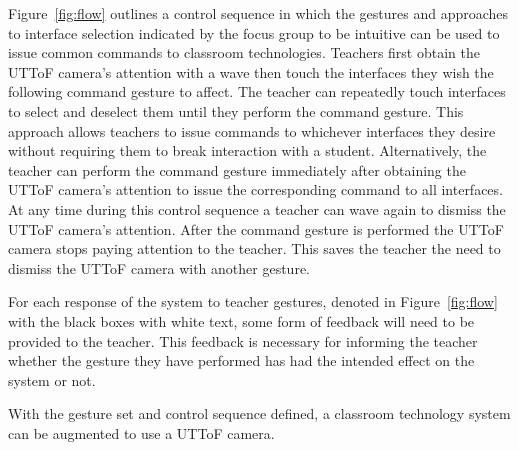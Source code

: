 \documentclass[manuscript, review, screen]{acmart}
\begin{document}
Figure~\ref{fig:flow} outlines a control sequence in which the gestures and approaches to interface selection indicated by the focus group to be intuitive can be used to issue common commands to classroom technologies.
Teachers first obtain the \ac{UTToF} camera's attention with a wave then touch the interfaces they wish the following command gesture to affect.
The teacher can repeatedly touch interfaces to select and deselect them until they perform the command gesture.
This approach allows teachers to issue commands to whichever interfaces they desire without requiring them to break interaction with a student.
Alternatively, the teacher can perform the command gesture immediately after obtaining the \ac{UTToF} camera's attention to issue the corresponding command to all interfaces.
At any time during this control sequence a teacher can wave again to dismiss the \ac{UTToF} camera's attention.
After the command gesture is performed the \ac{UTToF} camera stops paying attention to the teacher.
This saves the teacher the need to dismiss the \ac{UTToF} camera with another gesture.

For each response of the system to teacher gestures, denoted in Figure~\ref{fig:flow} with the black boxes with white text, some form of feedback will need to be provided to the teacher.
This feedback is necessary for informing the teacher whether the gesture they have performed has had the intended effect on the system or not.

With the gesture set and control sequence defined, a classroom technology system can be augmented to use a \ac{UTToF} camera.


\end{document}
